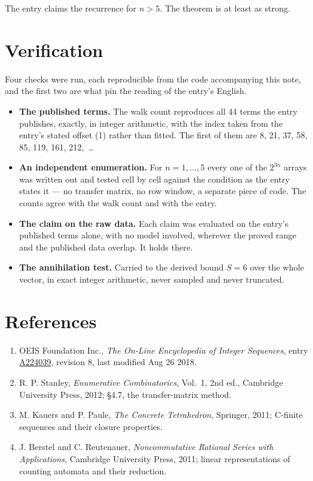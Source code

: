 \documentclass[11pt]{article}
\theoremstyle{definition}
\begin{document}
The entry claims the recurrence for $n > 5$. The theorem is at least as strong.

\section{Verification}

Four checks were run, each reproducible from the code accompanying this note, and the first two are what pin the reading of the entry's English.

\begin{itemize}

\item {\bfseries The published terms.} The walk count reproduces all 44 terms the entry publishes, exactly, in integer arithmetic, with the index taken from the entry's stated offset (1) rather than fitted. The first of them are 8, 21, 37, 58, 85, 119, 161, 212,~\dots

\item {\bfseries An independent enumeration.} For $n = 1,\dots,5$ every one of the $2^{3n}$ arrays was written out and tested cell by cell against the condition as the entry states it --- no transfer matrix, no row window, a separate piece of code. The counts agree with the walk count and with the entry.

\item {\bfseries The claim on the raw data.} Each claim was evaluated on the entry's published terms alone, with no model involved, wherever the proved range and the published data overlap. It holds there.

\item {\bfseries The annihilation test.} Carried to the derived bound $S = 6$ over the whole vector, in exact integer arithmetic, never sampled and never truncated.

\end{itemize}

\section{References}

\begin{enumerate}

\item OEIS Foundation Inc., \emph{The On-Line Encyclopedia of Integer Sequences}, entry \href{https://oeis.org/A224039}{A224039}, revision 8, last modified Aug 26 2018.

\item R. P. Stanley, \emph{Enumerative Combinatorics}, Vol.~1, 2nd ed., Cambridge University Press, 2012; \S4.7, the transfer-matrix method.

\item M. Kauers and P. Paule, \emph{The Concrete Tetrahedron}, Springer, 2011; C-finite sequences and their closure properties.

\item J. Berstel and C. Reutenauer, \emph{Noncommutative Rational Series with Applications}, Cambridge University Press, 2011; linear representations of counting automata and their reduction.

\end{enumerate}
\end{document}

